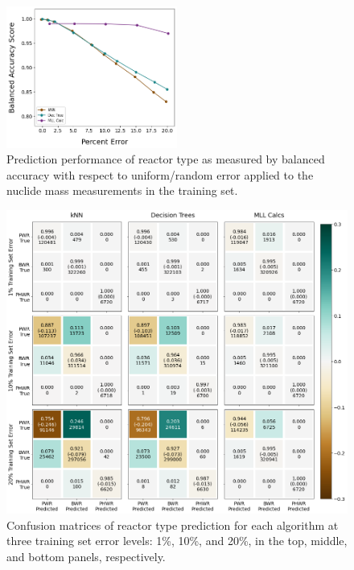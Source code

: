\begin{figure}[!htb]
  \centering
  \includegraphics[width=0.5\textwidth]{./chapters/exp1/randerr_compare_nuc29_BalAcc_rxtr.png}
  \caption{Prediction performance of reactor type as measured by balanced 
           accuracy with respect to uniform/random error applied to the nuclide 
           mass measurements in the training set.}
  \label{fig:randrxtr}
\end{figure}

\begin{figure}[!htb]
  \centering
  \includegraphics[width=\textwidth]{./chapters/exp1/confusion_matrix_nuc29_3errs.png}
  \caption{Confusion matrices of reactor type prediction for each algorithm 
           at three training set error levels: 1\%, 10\%, and 20\%, in the 
           top, middle, and bottom panels, respectively.}
  \label{fig:cm_nuc29}
\end{figure}

